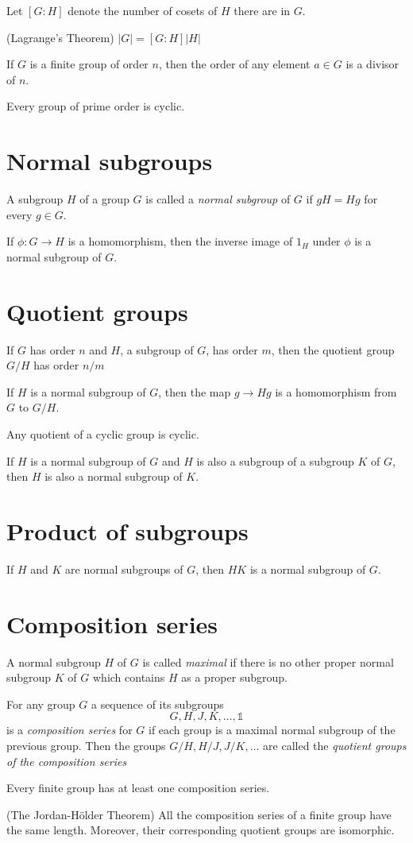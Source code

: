 Let $[G:H]$ denote the number of cosets of $H$ there are in $G$.

\theorem (Lagrange's Theorem)
$|G| = [G:H]|H|$

\theorem 
If $G$ is a finite group of order $n$, then the order of any element $a \in G$ is a divisor of $n$.

\theorem
Every group of prime order is cyclic.


\section{Normal subgroups}

A subgroup $H$ of a group $G$ is called a \textit{normal subgroup} of $G$ if $gH = Hg$ for every $g \in G$.

\theorem

\example

\theorem 
If $\phi: G \to H$ is a homomorphism, then the inverse image of $1_H$ under $\phi$ is a normal subgroup of $G$. 


\section{Quotient groups}

\theorem
If $G$ has order $n$ and $H$, a subgroup of $G$, has order $m$, then the quotient group $G/H$ has order $n/m$

\theorem
If $H$ is a normal subgroup of $G$, then the map $g \to Hg$ is a homomorphism from $G$ to $G/H$.

\theorem
Any quotient of a cyclic group is cyclic.

\theorem
If $H$ is a normal subgroup of $G$ and $H$ is also a subgroup of a subgroup $K$ of $G$, then $H$ is also a normal subgroup of $K$.


\section{Product of subgroups}

\theorem If $H$ and $K$ are normal subgroups of $G$, then $HK$ is a normal subgroup of $G$.


\section{Composition series}

A normal subgroup $H$ of $G$ is called \textit{maximal} if there is no other proper normal subgroup $K$ of $G$ which contains $H$ as a proper subgroup.

For any group $G$ a sequence of its subgroups
\[G, H, J, K, \ldots, \mathbb{1}\]
is a \textit{composition series} for $G$ if each group is a maximal normal subgroup of the previous group. Then the groups $G/H, H/J, J/K, \ldots$ are called the \textit{quotient groups of the composition series}

\theorem
Every finite group has at least one composition series.

\theorem (The Jordan-Hölder Theorem)
All the composition series of a finite group have the same length. Moreover, their corresponding quotient groups are isomorphic.

\theorem
